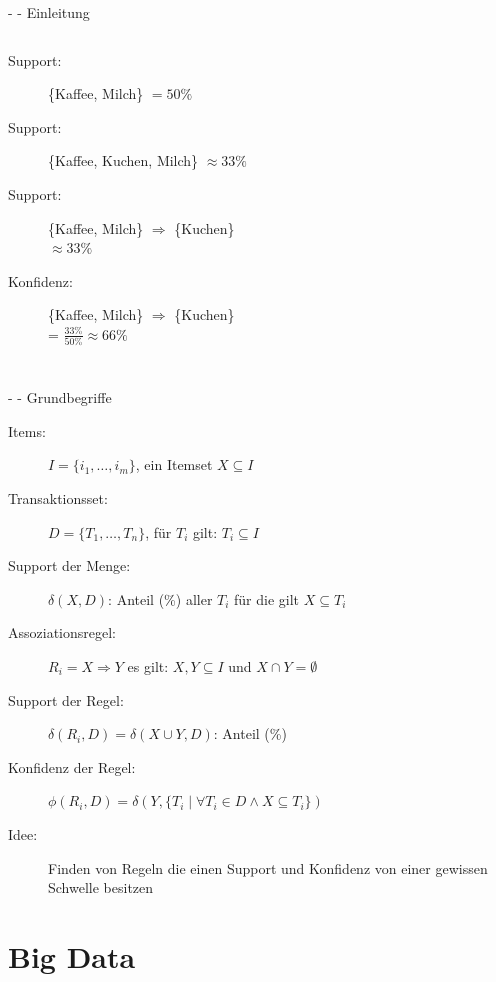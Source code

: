 \documentclass[fleqn,11pt,aspectratio=43]{beamer}
\begin{document}
\begin{frame}{\insertsectionhead - \insertsubsectionhead - Einleitung \cite{ester2000knowledge}}
\begin{columns}[onlytextwidth]
    \vspace{-1.5em}
	   \begin{description}
		   \item[Support:] \{Kaffee, Milch\} $= 50\%$
		   \item[Support:] \{Kaffee, Kuchen, Milch\} $\approx 33\%$
		   \item[Support:] \{Kaffee, Milch\} $\Rightarrow$ \{Kuchen\} \\ $\approx 33\%$
		   \item[Konfidenz:] \{Kaffee, Milch\} $\Rightarrow$ \{Kuchen\} \\= $\frac{33\%}{50\%} \approx 66\%$
	   \end{description}
\end{columns}
\end{frame}

\begin{frame}{\insertsectionhead - \insertsubsectionhead - Grundbegriffe \cite{ester2000knowledge}}
\begin{description}
\item[Items:] $I = \{i_1, \ldots, i_m\}$, ein Itemset $X \subseteq I$
\item[Transaktionsset:] $D = \{T_1, \ldots, T_n\}$, für $T_i$ gilt: $T_i \subseteq I$
\item[Support der Menge:] $\delta(X,D)$: Anteil (\%) aller $T_i$ für die gilt $X \subseteq T_i$
\item[Assoziationsregel:] $R_i = X \Rightarrow Y$ es gilt: $X, Y \subseteq I$ und $X \cap Y = \emptyset$ 
\item[Support der Regel:] $\delta(R_i, D) = \delta(X \cup Y, D)$: Anteil (\%)
\item[Konfidenz der Regel:] $\phi(R_i, D) = \delta(Y, \{T_i\;|\;\forall T_i \in D \wedge X \subseteq T_i\})$
\item[Idee:] Finden von Regeln die einen Support und Konfidenz von einer gewissen Schwelle besitzen
\end{description}
\end{frame}
		

\section{Big Data~}
\end{document}
